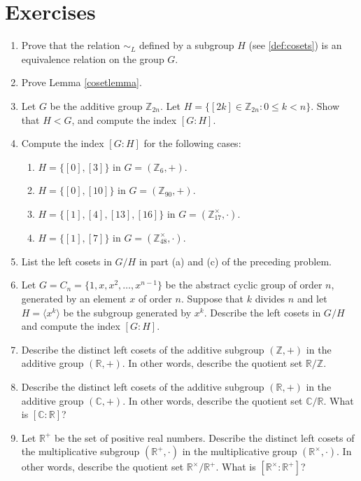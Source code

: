 \documentclass[11pt,oneside]{article}
\newenvironment{problems}
{
 \begin{enumerate}[topsep=1pt,itemsep=0pt,parsep=2pt,leftmargin=0.6cm,%
 label={\arabic*.}, ref=\arabic*] \small
}
{
 \end{enumerate}
}
\theoremstyle{definition}
\newcommand{\R}{\mathbb{R}} %
\newcommand{\C}{\mathbb{C}} %
\newcommand{\Z}{\mathbb{Z}} %
\newcommand{\gen}[1]{\langle #1 \rangle}
\begin{document}
\section*{Exercises}
\begin{problems}

\item Prove that the relation $\sim_L$ defined by a subgroup $H$ (see
  \ref{def:cosets}) is an equivalence relation on the group $G$.

\item Prove Lemma \ref{cosetlemma}. 

\item Let $G$ be the additive group $\Z_{2n}$. Let $H = \{ [2k] \in
  \Z_{2n} \colon 0 \le k < n \}$. Show that $H < G$, and compute the
  index $[G \colon H]$.

\item Compute the index $[G:H]$ for the following cases:
  \begin{enumerate}
  \item $H = \{[0],[3]\}$ in $G=(\Z_6,+)$. 
  \item $H = \{[0], [10]\}$ in $G = (\Z_{90},+)$.
  \item $H = \{[1],[4],[13],[16]\}$ in $G = (\Z_{17}^\times, \cdot)$.
  \item $H = \{[1],[7]\}$ in $G = (\Z_{48}^\times, \cdot)$.
  \end{enumerate}

\item List the left cosets in $G/H$ in part (a) and (c) of the
  preceding problem.

\item Let $G=C_n = \{1, x, x^2, \dots, x^{n-1} \}$ be the abstract
  cyclic group of order $n$, generated by an
  element $x$ of order $n$. Suppose that $k$ divides $n$ and let
  $H = \gen{x^k}$ be the subgroup generated by $x^k$. Describe the
  left cosets in $G/H$ and compute the index $[G:H]$.

\item Describe the distinct left cosets of the additive subgroup
  $(\Z,+)$ in the additive group $(\R,+)$. In other words, describe
  the quotient set $\R/\Z$.

\item Describe the distinct left cosets of the additive subgroup
  $(\R,+)$ in the additive group $(\C,+)$. In other words, describe
  the quotient set $\C/\R$. What is $[\C: \R]$?

\item Let $\R^+$ be the set of positive real numbers.  Describe the
  distinct left cosets of the multiplicative subgroup $(\R^+,\cdot)$
  in the multiplicative group $(\R^\times,\cdot)$. In other words,
  describe the quotient set $\R^\times/\R^+$. What is $[\R^\times:
    \R^+]$?


\end{problems}
\end{document}
